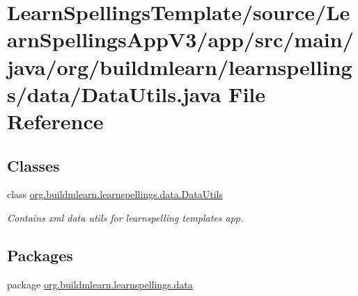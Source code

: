 \hypertarget{LearnSpellingsTemplate_2source_2LearnSpellingsAppV3_2app_2src_2main_2java_2org_2buildmlearn_2leaaf439b0d67e1b2f3f955067c37f1bc25}{}\section{Learn\+Spellings\+Template/source/\+Learn\+Spellings\+App\+V3/app/src/main/java/org/buildmlearn/learnspellings/data/\+Data\+Utils.java File Reference}
\label{LearnSpellingsTemplate_2source_2LearnSpellingsAppV3_2app_2src_2main_2java_2org_2buildmlearn_2leaaf439b0d67e1b2f3f955067c37f1bc25}
\subsection*{Classes}
\begin{DoxyCompactItemize}
\item 
class \hyperlink{classorg_1_1buildmlearn_1_1learnspellings_1_1data_1_1DataUtils}{org.\+buildmlearn.\+learnspellings.\+data.\+Data\+Utils}
\begin{DoxyCompactList}\small\item\em Contains xml data utils for learnspelling template\textquotesingle{}s app. \end{DoxyCompactList}\end{DoxyCompactItemize}
\subsection*{Packages}
\begin{DoxyCompactItemize}
\item 
package \hyperlink{namespaceorg_1_1buildmlearn_1_1learnspellings_1_1data}{org.\+buildmlearn.\+learnspellings.\+data}
\end{DoxyCompactItemize}
